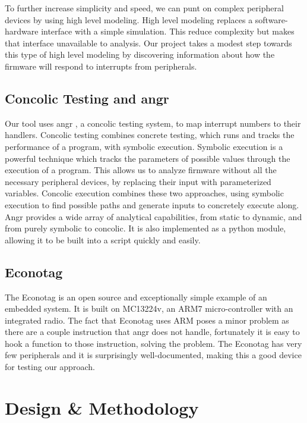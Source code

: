 \documentclass[letterpaper, 11 pt, conference]{ieeeconf}
\begin{document}
To further increase simplicity and speed, we can punt on complex peripheral devices by using high level modeling. High level modeling replaces a software-hardware interface with a simple simulation. This reduce complexity but makes that interface unavailable to analysis. Our project takes a modest step towards this type of high level modeling by discovering information about how the firmware will respond to interrupts from peripherals.

\subsection{Concolic Testing and angr} \label{concolic}
Our tool uses angr \cite{angr}, a concolic testing system, to map interrupt numbers to their handlers. Concolic testing combines concrete testing, which runs and tracks the performance of a program, with symbolic execution. Symbolic execution is a powerful technique which tracks the parameters of possible values through the execution of a program. This allows us to analyze firmware without all the necessary peripheral devices, by replacing their input with parameterized variables. Concolic execution combines these two approaches, using symbolic execution to find possible paths and generate inputs to concretely execute along. Angr provides a wide array of analytical capabilities, from static to dynamic, and from purely symbolic to concolic. It is also implemented as a python module, allowing it to be built into a script quickly and easily.

\subsection{Econotag} \label{econotag}
The Econotag \cite{etag} is an open source and exceptionally simple example of an embedded system. It is built on MC13224v, an ARM7 micro-controller with an integrated radio. The fact that Econotag uses ARM poses a minor problem as there are a couple instruction that angr does not handle, fortunately it is easy to hook a function to those instruction, solving the problem. The Econotag has very few peripherals and it is surprisingly well-documented, making this a good device for testing our approach.

\section{Design \& Methodology} \label{method}
\end{document}

